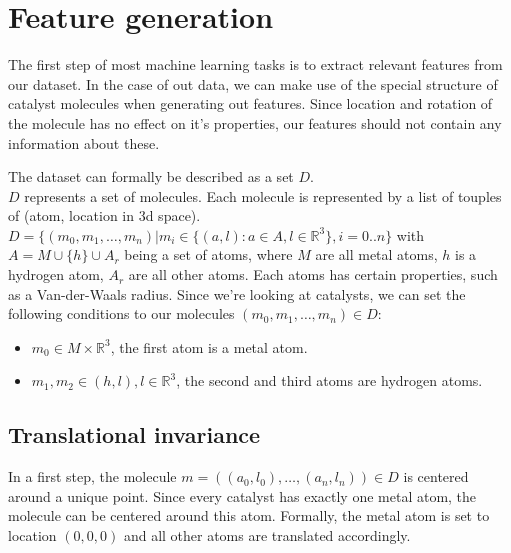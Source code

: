 
\chapter{Feature generation}
\label{ch:Content1}

The first step of most machine learning tasks is to extract relevant features from our dataset.
In the case of out data, we can make use of the special structure of catalyst molecules when generating out features.
Since location and rotation of the molecule has no effect on it's properties, our features should not contain any information about these.

The dataset can formally be described as a set $D$. \\
$D$ represents a set of molecules. Each molecule is represented by a list of touples of (atom, location in 3d space). \\
$D = \{(m_0, m_1, \dots, m_n)| m_i \in \{ (a, l): a \in A, l \in \mathbb{R}^3\}, i = 0..n\}$ with $A = M \cup \{h\} \cup A_r$ being a set of atoms, where $M$ are all metal atoms, $h$ is a hydrogen atom, $A_r$ are all other atoms. 
Each atoms has certain properties, such as a Van-der-Waals radius. 
Since we're looking at catalysts, we can set the following conditions to our molecules $(m_0, m_1, \dots, m_n) \in D$:
\begin{itemize}
  \item $m_0 \in M \times \mathbb{R}^3$, the first atom is a metal atom.
  \item $m_1, m_2 \in (h, l), l \in \mathbb{R}^3$, the second and third atoms are hydrogen atoms.
\end{itemize}

\section{Translational invariance}


In a first step, the molecule $m=((a_0, l_0),\dots,(a_n, l_n)) \in D$ is centered around a unique point.
Since every catalyst has exactly one metal atom, the molecule can be centered around this atom.
Formally, the metal atom is set to location $(0,0,0)$ and all other atoms are translated accordingly.

